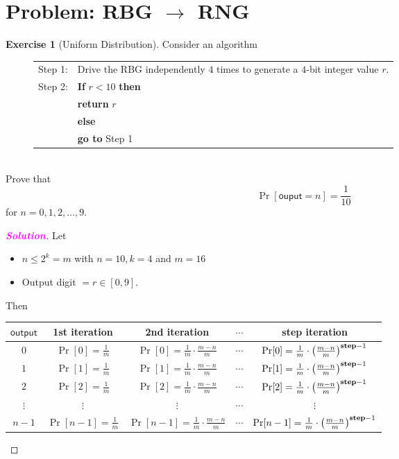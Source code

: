 \documentclass[12pt,openany]{book}
\theoremstyle{definition}
\newtheorem{exercise}{Exercise}[chapter]
\newcommand{\sol}{\textcolor{magenta}{\bf Solution}}
\newcommand{\tab}{\hspace{12pt}}
\begin{document}
	\section{Problem: RBG $\rightarrow$ RNG}
	\begin{exercise}[Uniform Distribution]
		Consider an algorithm 
		\begin{figure}[h!]
			\centering
			\begin{tabularx}{\textwidth}{cl}
				Step 1:& Drive the RBG independently $4$ times to generate a $4$-bit integer value $r$.\\
				Step 2:& \textbf{If} $r<10$ \textbf{then}\\
				&\tab\textbf{return} $r$\\
				&\textbf{else}\\
				&\tab \textbf{go to} Step 1
			\end{tabularx}
		\end{figure}\\
		Prove that \[
		\Pr[\mathsf{ouput}=n]=\frac{1}{10}
		\] for $n=0,1,2,\dots, 9$.
		\begin{proof}[\sol]
			Let \begin{itemize}
				\item $n\leq 2^k=m$ with $n=10, k=4$ and $m = 16$
				\item Output digit $=r\in[0,9]$.
			\end{itemize} Then \begin{table}[h!]\centering
				\begin{tabularx}{\textwidth}{c||c|c|c|c}
					\toprule[1.2pt]
					$\mathsf{output}$ & \textbf{1st iteration} & \textbf{2nd iteration} & $\cdots$ &\textbf{step iteration}\\
					\midrule
					$0$ & $\Pr[0]=\frac{1}{m}$ & $\Pr[0]=\frac{1}{m}\cdot\frac{m-n}{m}$ & $\cdots$ & $\Pr[0]=\frac{1}{m}\cdot\del{\frac{m-n}{m}}^{\textbf{step}-1}$\\
					$1$ & $\Pr[1]=\frac{1}{m}$ & $\Pr[1]=\frac{1}{m}\cdot\frac{m-n}{m}$ & $\cdots$ & $\Pr[1]=\frac{1}{m}\cdot\del{\frac{m-n}{m}}^{\textbf{step}-1}$\\
					$2$ & $\Pr[2]=\frac{1}{m}$ & $\Pr[2]=\frac{1}{m}\cdot\frac{m-n}{m}$ & $\cdots$ & $\Pr[2]=\frac{1}{m}\cdot\del{\frac{m-n}{m}}^{\textbf{step}-1}$\\
					$\vdots$&$\vdots$&$\vdots$&$\cdots$&$\vdots$\\
					$n-1$ & $\Pr[n-1]=\frac{1}{m}$ & $\Pr[n-1]=\frac{1}{m}\cdot\frac{m-n}{m}$ & $\cdots$ & $\Pr[n-1]=\frac{1}{m}\cdot\del{\frac{m-n}{m}}^{\textbf{step}-1}$\\

\end{tabularx}
\end{table}
\end{proof}
\end{exercise}
\end{document}
